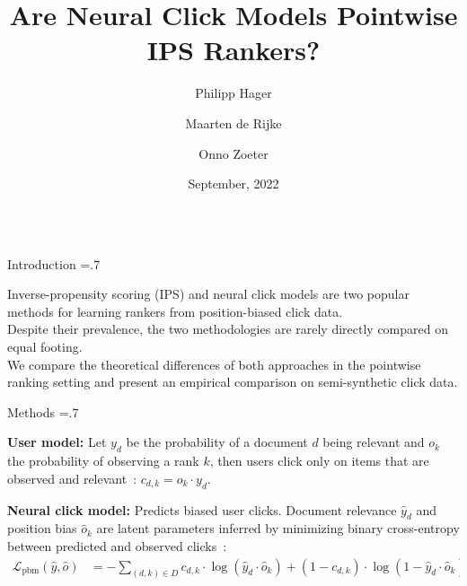 \documentclass[final]{beamer}
\title{\huge Are Neural Click Models Pointwise IPS Rankers?}
\author{Philipp Hager\inst{1} \and Maarten de Rijke\inst{1} \and Onno Zoeter\inst{2}}
\institute[shortinst]{\inst{1} University of Amsterdam \inst{2} Booking.com}
\date[Sep. 2022]{September, 2022}
\newlength{\onecolwid}
\begin{document}
\begin{frame}[t]
	\begin{columns}[t]
    \begin{column}{\onecolwid}
    \begin{block}{Introduction}
	\baselineskip=.7\baselineskip

	Inverse-propensity scoring (IPS) and neural click models are two popular methods for learning rankers from position-biased click data.\\
	\vspace{1ex}
	Despite their prevalence, the two methodologies are rarely directly compared on equal footing.\\
	\vspace{1ex}
	We compare the theoretical differences of both approaches in the pointwise ranking setting and present an empirical comparison on semi-synthetic click data.

	\end{block}

	\vspace{1ex}

	\begin{block}{Methods}
		\baselineskip=.7\baselineskip
	
		\textbf{User model:} Let $y_d$ be the probability of a document $d$ being relevant and $o_k$ the probability of observing a rank $k$, then users click only on items that are observed and relevant~\cite{Craswell2008Cascade}: $c_{d,k} = o_k \cdot y_d$.
		
		\vspace{1ex}
		
		\textbf{Neural click model:} Predicts biased user clicks. Document relevance $\hat{y}_d$ and position bias $\hat{o}_k$ are latent parameters inferred by minimizing binary cross-entropy between predicted and observed clicks~\cite{Yan2022TwoTowers}:
		\vspace{1ex}
		\begin{equation*}
			\begin{split}
			\mathcal{L}_{\text{pbm}}(\hat{y}, \hat{o}) &= - \sum_{(d, k) \in D} c_{d,k} \cdot \log(\hat{y}_{d} \cdot \hat{o}_{k}) + (1 - c_{d,k}) \cdot \log(1 - \hat{y}_{d} \cdot \hat{o}_{k}).
			\end{split}
		\end{equation*}


\end{block}
\end{column}
\end{columns}
\end{frame}
\end{document}
